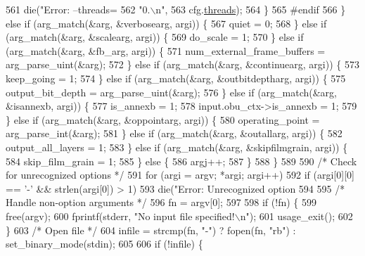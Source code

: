 \begin{DoxyCodeInclude}
{{{{{{{{{{{{{{{{{{{{{{{{{{{561         die(\textcolor{stringliteral}{"Error: --threads=%
562             \textcolor{stringliteral}{"0.\(\backslash\)n"},
563             cfg.\hyperlink{structaom__codec__dec__cfg_a48c68337e1071e2aee36c649e579f189}{threads});
564       \}
565 \textcolor{preprocessor}{#endif}
566     \} \textcolor{keywordflow}{else} \textcolor{keywordflow}{if} (arg\_match(&arg, &verbosearg, argi)) \{
567       quiet = 0;
568     \} \textcolor{keywordflow}{else} \textcolor{keywordflow}{if} (arg\_match(&arg, &scalearg, argi)) \{
569       do\_scale = 1;
570     \} \textcolor{keywordflow}{else} \textcolor{keywordflow}{if} (arg\_match(&arg, &fb\_arg, argi)) \{
571       num\_external\_frame\_buffers = arg\_parse\_uint(&arg);
572     \} \textcolor{keywordflow}{else} \textcolor{keywordflow}{if} (arg\_match(&arg, &continuearg, argi)) \{
573       keep\_going = 1;
574     \} \textcolor{keywordflow}{else} \textcolor{keywordflow}{if} (arg\_match(&arg, &outbitdeptharg, argi)) \{
575       output\_bit\_depth = arg\_parse\_uint(&arg);
576     \} \textcolor{keywordflow}{else} \textcolor{keywordflow}{if} (arg\_match(&arg, &isannexb, argi)) \{
577       is\_annexb = 1;
578       input.obu\_ctx->is\_annexb = 1;
579     \} \textcolor{keywordflow}{else} \textcolor{keywordflow}{if} (arg\_match(&arg, &oppointarg, argi)) \{
580       operating\_point = arg\_parse\_int(&arg);
581     \} \textcolor{keywordflow}{else} \textcolor{keywordflow}{if} (arg\_match(&arg, &outallarg, argi)) \{
582       output\_all\_layers = 1;
583     \} \textcolor{keywordflow}{else} \textcolor{keywordflow}{if} (arg\_match(&arg, &skipfilmgrain, argi)) \{
584       skip\_film\_grain = 1;
585     \} \textcolor{keywordflow}{else} \{
586       argj++;
587     \}
588   \}
589 
590   \textcolor{comment}{/* Check for unrecognized options */}
591   \textcolor{keywordflow}{for} (argi = argv; *argi; argi++)
592     \textcolor{keywordflow}{if} (argi[0][0] == \textcolor{charliteral}{'-'} && strlen(argi[0]) > 1)
593       die(\textcolor{stringliteral}{"Error: Unrecognized option %
594 
595   \textcolor{comment}{/* Handle non-option arguments */}
596   fn = argv[0];
597 
598   \textcolor{keywordflow}{if} (!fn) \{
599     free(argv);
600     fprintf(stderr, \textcolor{stringliteral}{"No input file specified!\(\backslash\)n"});
601     usage\_exit();
602   \}
603   \textcolor{comment}{/* Open file */}
604   infile = strcmp(fn, \textcolor{stringliteral}{"-"}) ? fopen(fn, \textcolor{stringliteral}{"rb"}) : set\_binary\_mode(stdin);
605 
606   \textcolor{keywordflow}{if} (!infile) \{
}}}}}}}}}}}}}}}}}}}}}}}}}}}}}
\end{DoxyCodeInclude}
